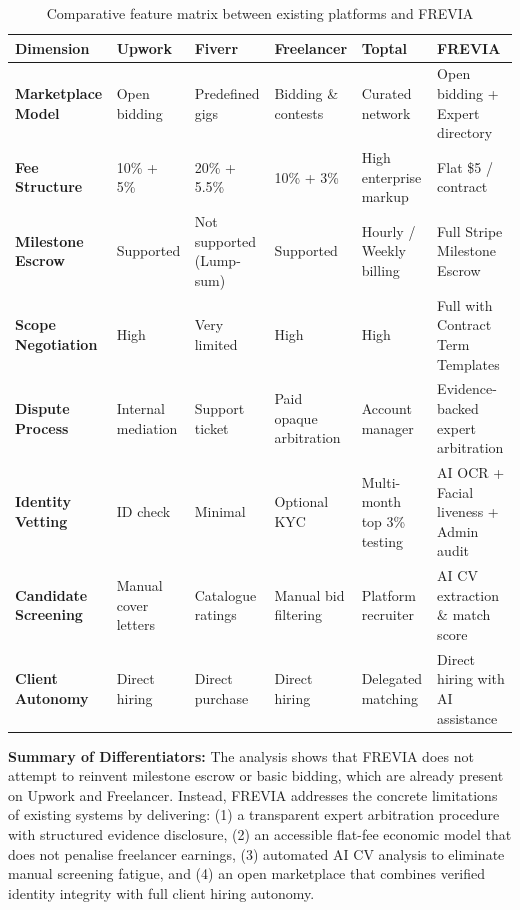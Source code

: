\begin{table}[H]
\centering
\caption{Comparative feature matrix between existing platforms and FREVIA}
\label{tab:existing-comparison}
\footnotesize
\setlength{\tabcolsep}{4pt}
\begin{tabularx}{\textwidth}{|>{\bfseries}p{2.8cm}|X|X|X|X|p{2.8cm}|}
\hline
\rowcolor{fptHeader}\textcolor{fptHeaderText}{\textbf{Dimension}} & \textcolor{fptHeaderText}{\textbf{Upwork}} & \textcolor{fptHeaderText}{\textbf{Fiverr}} & \textcolor{fptHeaderText}{\textbf{Freelancer}} & \textcolor{fptHeaderText}{\textbf{Toptal}} & \textcolor{fptHeaderText}{\textbf{FREVIA}} \\ \hline
Marketplace Model & Open bidding & Predefined gigs & Bidding \& contests & Curated network & Open bidding + Expert directory \\ \hline
Fee Structure & 10\% + 5\% & 20\% + 5.5\% & 10\% + 3\% & High enterprise markup & Flat \$5 / contract \\ \hline
Milestone Escrow & Supported & Not supported (Lump-sum) & Supported & Hourly / Weekly billing & Full Stripe Milestone Escrow \\ \hline
Scope Negotiation & High & Very limited & High & High & Full with Contract Term Templates \\ \hline
Dispute Process & Internal mediation & Support ticket & Paid opaque arbitration & Account manager & Evidence-backed expert arbitration \\ \hline
Identity Vetting & ID check & Minimal & Optional KYC & Multi-month top 3\% testing & AI OCR + Facial liveness + Admin audit \\ \hline
Candidate Screening & Manual cover letters & Catalogue ratings & Manual bid filtering & Platform recruiter & AI CV extraction \& match score \\ \hline
Client Autonomy & Direct hiring & Direct purchase & Direct hiring & Delegated matching & Direct hiring with AI assistance \\ \hline
\end{tabularx}
\end{table}

\noindent\textbf{Summary of Differentiators:} The analysis shows that FREVIA does not attempt to reinvent milestone escrow or basic bidding, which are already present on Upwork and Freelancer. Instead, FREVIA addresses the concrete limitations of existing systems by delivering: (1) a transparent expert arbitration procedure with structured evidence disclosure, (2) an accessible flat-fee economic model that does not penalise freelancer earnings, (3) automated AI CV analysis to eliminate manual screening fatigue, and (4) an open marketplace that combines verified identity integrity with full client hiring autonomy.
